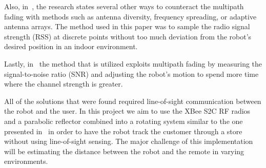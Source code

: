 \vspace*{12pt}
\noindent
Also, in~\cite{lindhe_johansson_bicchi_2007}, the research states several other ways to counteract the multipath fading with methods such as antenna diversity, frequency spreading, or adaptive antenna arrays. The method used in this paper was to sample the radio signal strength (RSS) at discrete points without too much deviation from the robot's desired position in an indoor environment.

\vspace*{12pt}
\noindent
Lastly, in~\cite{Lindhe2009} the method that is utilized exploits multipath fading by measuring the signal-to-noise ratio (SNR) and adjusting the robot's motion to spend more time where the channel strength is greater.

\vspace*{12pt}
\noindent
All of the solutions that were found required line-of-sight communication between the robot and the user. In this project we aim to use the XBee S2C RF radios and a parabolic reflector combined into a rotating system similar to the one presented in~\cite{Miah2018-Intelligent} in order to have the robot track the customer through a store without using line-of-sight sensing. The major challenge of this implementation will be estimating the distance between the robot and the remote in varying environments.

